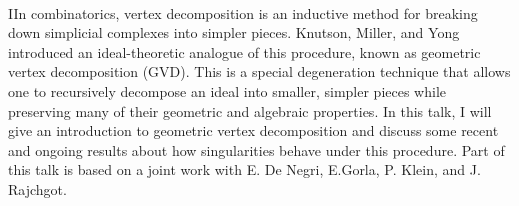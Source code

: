 \documentclass[12pt]{amsart}
\begin{document}
\begin{itemize}
\

\noindent IIn combinatorics, vertex decomposition is an inductive method for breaking down simplicial complexes into simpler pieces. Knutson, Miller, and Yong introduced an ideal-theoretic analogue of this procedure, known as geometric vertex decomposition (GVD). This is a special degeneration technique that allows one to recursively decompose an ideal into smaller, simpler pieces while preserving many of their geometric and algebraic properties. In this talk, I will give an introduction to geometric vertex decomposition and discuss some recent and ongoing results about how singularities behave under this procedure.
Part of this talk is based on a joint work with E. De Negri, E.Gorla, P. Klein, and J. Rajchgot.

\vfill

\end{itemize}

\vfill
\end{document}
